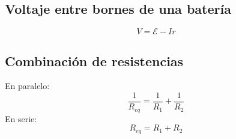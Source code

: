 \documentclass{report}
\begin{document}
    \subsection*{Voltaje entre bornes de una batería}

      \begin{equation*}
        V=\mathcal{E}-Ir
      \end{equation*}

    \subsection*{Combinación de resistencias}
      
      En paralelo:\\
      \begin{equation*}
        \frac{1}{R_{eq}}=\frac{1}{R_1}+\frac{1}{R_2}
      \end{equation*}
      \indent En serie:
      \begin{equation*}
        R_{eq}=R_1+R_2
      \end{equation*}
\end{document}
